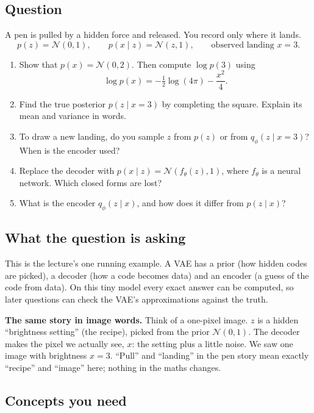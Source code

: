 \documentclass[12pt,a4paper]{article}
\begin{document}
\subsection{Question}

A pen is pulled by a hidden force and released. You record only where it lands.
\[
p(z)=\mathcal{N}(0,1),\qquad p(x\mid z)=\mathcal{N}(z,1),\qquad\text{observed landing }x=3 .
\]
\begin{enumerate}[label=(\alph*)]
  \item Show that $p(x)=\mathcal{N}(0,2)$. Then compute $\log p(3)$ using
  \[
  \log p(x)=-\tfrac12\log(4\pi)-\frac{x^2}{4}.
  \]
  \item Find the true posterior $p(z\mid x=3)$ by completing the square. Explain its mean and variance in words.
  \item To draw a new landing, do you sample $z$ from $p(z)$ or from $q_\phi(z\mid x=3)$? When is the encoder used?
  \item Replace the decoder with $p(x\mid z)=\mathcal{N}(f_\theta(z),1)$, where $f_\theta$ is a neural network. Which closed forms are lost?
  \item What is the encoder $q_\phi(z\mid x)$, and how does it differ from $p(z\mid x)$?
\end{enumerate}

\subsection{What the question is asking}

This is the lecture's one running example. A VAE has a prior (how hidden codes are picked), a decoder (how a code becomes data) and an encoder (a guess of the code from data). On this tiny model every exact answer can be computed, so later questions can check the VAE's approximations against the truth.

\textbf{The same story in image words.} Think of a one-pixel image. $z$ is a hidden ``brightness setting'' (the recipe), picked from the prior $\mathcal{N}(0,1)$. The decoder makes the pixel we actually see, $x$: the setting plus a little noise. We saw one image with brightness $x=3$. ``Pull'' and ``landing'' in the pen story mean exactly ``recipe'' and ``image'' here; nothing in the maths changes.

\subsection{Concepts you need}
\end{document}

